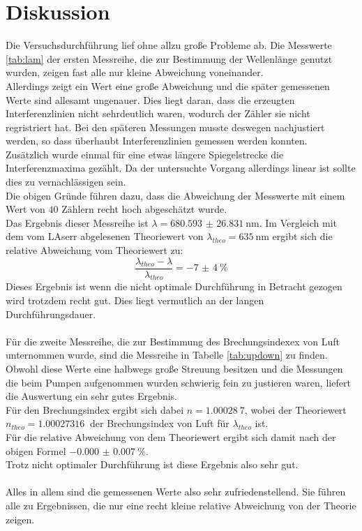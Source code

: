 \newpage
\section{Diskussion}

\noindent Die Versuchsdurchführung lief ohne allzu große Probleme ab. 
Die Messwerte \ref{tab:lam} der ersten Messreihe, die zur Bestimmung der Wellenlänge genutzt wurden, zeigen fast alle nur kleine Abweichung voneinander.\\
Allerdings zeigt ein Wert eine große Abweichung und die später gemessenen Werte sind allesamt ungenauer. Dies liegt daran, dass die erzeugten Interferenzlinien nicht sehrdeutlich waren, wodurch der Zähler sie nicht regristriert hat.
Bei den späteren Messungen musste deswegen nachjustiert werden, so dass überhaubt Interferenzlinien gemessen werden konnten.\\
Zusätzlich wurde einmal für eine etwas längere Spiegelstrecke die Interferenzmaxima gezählt. Da der untersuchte Vorgang allerdings linear ist sollte dies zu vernachlässigen sein.\\
Die obigen Gründe führen dazu, dass die Abweichung der Messwerte mit einem Wert von $40$ Zählern recht hoch abgeschätzt wurde.\\
Das Ergebnis dieser Messreihe ist $\lambda= \SI{680.593(26831)}{\nano\metre}$.
Im Vergleich mit dem vom LAserr abgelesenen Theoriewert von $\lambda_{theo}=\SI{635}{\nano\metre}$ ergibt sich die relative Abweichung vom Theoriewert zu:
\begin{equation*}
    \frac{\lambda_{theo}-\lambda}{\lambda_{theo}}=\SI{-7(4)}{\percent}
\end{equation*}
Dieses Ergebnis ist wenn die nicht optimale Durchführung in Betracht gezogen wird trotzdem recht gut. Dies liegt vermutlich an der langen Durchführungsdauer.\\\\

\noindent Für die zweite Messreihe, die zur Bestimmung des Brechungsindexex von Luft unternommen wurde, sind die Messreihe in Tabelle \ref{tab:updown} zu finden. 
Obwohl diese Werte eine halbwegs große Streuung besitzen und die Messungen die beim Pumpen aufgenommen wurden schwierig fein zu justieren waren, liefert die Auswertung ein sehr gutes Ergebnis.\\
Für den Brechungsindex ergibt sich dabei $n=\SI{1.00028}{7}$, wobei der Theoriewert $n_{theo}=\SI{1.00027316}{}$\cite{n} der Brechungsindex von Luft für $\lambda_{theo}$ ist.\\
Für die relative Abweichung von dem Theoriewert ergibt sich damit nach der obigen Formel  $\SI{-0.000(0007)}{\percent}$.\\
Trotz nicht optimaler Durchführung ist diese Ergebnis also sehr gut.\\\\
Alles in allem sind die gemessenen Werte also sehr zufriedenstellend. Sie führen alle zu Ergebnissen, die nur eine recht kleine relative Abweichung von der Theorie zeigen. 
\newpage
